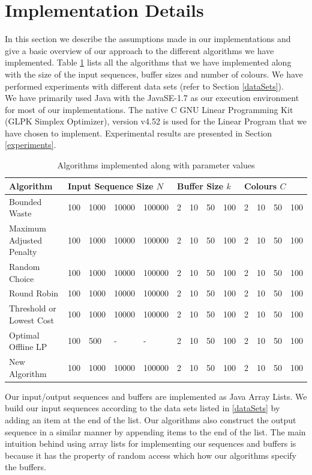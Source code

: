 \section{Implementation Details} \label{impldet}
In this section we describe the assumptions made in our implementations and give a basic overview of our approach to the different algorithms we have implemented. Table \ref{implalgo} lists all the algorithms that we have implemented along with the size of the input sequences, buffer sizes and number of colours. We have performed experiments with different data sets (refer to Section \ref{dataSets}). \\

We have primarily used Java with the JavaSE-1.7 as our execution environment for most of our implementations. The native C GNU Linear Programming Kit (GLPK Simplex Optimizer), version v4.52 is used for the Linear Program that we have chosen to implement. Experimental results are presented in Section \ref{experiments}.

\begin{table}[ht]
\label{implalgo}
\caption{Algorithms implemented along with parameter values}
\centering
\begin{tabular}{l llll llll llll}
\hline \hline
Algorithm&\multicolumn{4}{l}{Input Sequence Size $N$}&\multicolumn{4}{l}{Buffer
Size $k$}&\multicolumn{4}{l}{Colours $C$} \\
\hline
Bounded Waste & 100 & 1000 & 10000 & 100000 & 2 & 10 & 50 & 100 & 2 & 10 & 50 &
100 \\
Maximum Adjusted Penalty & 100 & 1000 & 10000 & 100000 & 2 & 10 & 50 & 100 & 2 &
10 & 50 & 100 \\
Random Choice & 100 & 1000 & 10000 & 100000 & 2 & 10 & 50 & 100 & 2 & 10 & 50 &
100 \\
Round Robin & 100 & 1000 & 10000 & 100000 & 2 & 10 & 50 & 100 & 2 & 10 & 50 &
100 \\
Threshold or Lowest Cost & 100 & 1000 & 10000 & 100000 & 2 & 10 & 50 & 100 & 2 &
10 & 50 & 100 \\
Optimal Offline LP & 100 & 500 & - & - & 2 & 10 & 50 & 100 & 2 & 10 &
50 & 100 \\
New Algorithm & 100 & 1000 & 10000 & 100000 & 2 & 10 & 50 & 100 & 2 &
10 & 50 & 100 \\
\hline
\end{tabular}
\end{table}

Our input/output sequences and buffers are implemented as Java Array Lists. We build our input sequences according to the data sets listed in \ref{dataSets} by adding an item at the end of the list. Our algorithms also construct the output sequence in a similar manner by appending items to the end of the list. The main intuition behind using array lists for implementing our sequences and buffers is because it has the property of random access which how our algorithms specify the buffers. 

